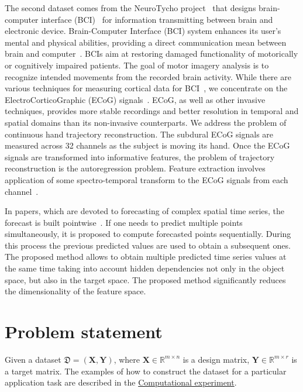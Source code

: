 \documentclass[12pt,twoside]{article}
\newcommand{\bY}{\mathbf{Y}}
\newcommand{\bX}{\mathbf{X}}
\begin{document}
The second dataset comes from the NeuroTycho project~\cite{neurotycho} that designs brain-computer interface (BCI)~\cite{millan2010combining,mason2007comprehensive} for information transmitting between brain and electronic device.
Brain-Computer Interface (BCI) system enhances its user’s mental and physical abilities, providing a direct communication mean between brain and computer~\cite{millan2004brain}. 
BCIs aim at restoring damaged functionality of motorically or cognitively impaired patients.
The goal of motor imagery analysis is to recognize intended movements from the recorded brain activity. 
While there are various techniques for measuring cortical data for BCI~\cite{nicolas2012brain,amiri2013review}, we concentrate on the ElectroCorticoGraphic (ECoG) signals~\cite{eliseyev2016penalized}. 
ECoG, as well as other invasive techniques, provides more stable recordings and better resolution in temporal and spatial domains than its non-invasive counterparts.
We address the problem of continuous hand trajectory reconstruction. 
The subdural ECoG signals are measured across 32 channels as the subject is moving its hand.
Once the ECoG signals are transformed into informative features, the problem of trajectory reconstruction is the autoregression problem. 
Feature extraction involves application of some spectro-temporal transform to the ECoG signals from each channel~\cite{gasanov2017pls}.

In papers, which are devoted to forecasting of complex spatial time series, the forecast is built pointwise~\cite{box2015time,zhang2003time}.
If one needs to predict multiple points simultaneously, it is proposed to compute forecasted points sequentially.
During this process the previous predicted values are used to obtain a subsequent ones.
The proposed method allows to obtain multiple predicted time series values at the same time taking into account hidden dependencies not only in the object space, but also in the target space.
The proposed method significantly reduces the dimensionality of the feature space.
 

\section{Problem statement}

Given a dataset $\mathfrak{D}= \left( \bX, \bY \right)$, where $\mathbf{X} \in \mathbb{R}^{m \times n}$ is a design matrix, $\mathbf{Y} \in \mathbb{R}^{m \times r}$ is a target matrix. 
The examples of how to construct the dataset for a particular application task are described in the \hyperref[sec:exper]{Computational experiment}.
\end{document}
